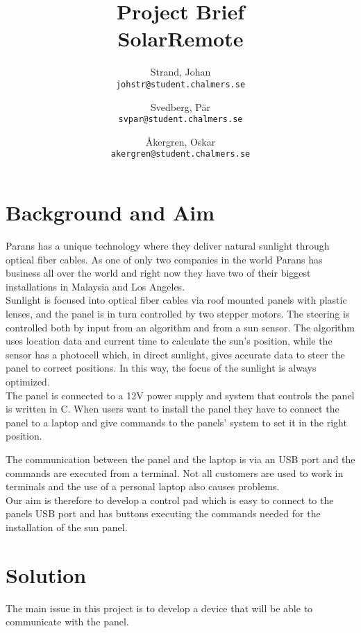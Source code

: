 \documentclass[a4paper]{article}
\author{    Strand, Johan \\ \texttt{johstr@student.chalmers.se} \and
            Svedberg, Pär\\ \texttt{svpar@student.chalmers.se} \and
            Åkergren, Oskar\\ \texttt{akergren@student.chalmers.se}
}
\title{\vspace{-3cm} Project Brief  \\ SolarRemote}
\begin{document}
	\maketitle

	\section*{Background and Aim} %
	\label{sec:background_and_aim}
    	Parans has a unique technology where they deliver natural sunlight through optical fiber cables. As one of only two companies in the world Parans has business all over the world and right now they have two of their biggest installations in Malaysia and Los Angeles. \\

    	\noindent Sunlight is focused into optical fiber cables via roof mounted panels with plastic lenses, and the panel is in turn controlled by two stepper motors. The steering is controlled both by input from an algorithm and from a sun sensor. The algorithm uses location data and current time to calculate the sun's position, while the sensor has a photocell which, in direct sunlight, gives accurate data to steer the panel to correct positions. In this way, the focus of the sunlight is always optimized. \\

        \noindent The panel is connected to a 12V power supply and system that controls the panel is written in C. When users want to install the panel they have to connect the panel to a laptop and give commands to the panels' system to set it in the right position.
        
        The communication between the panel and the laptop is via an USB port and the commands are executed from a terminal. Not all customers are used to work in terminals and the use of a personal laptop also causes problems. \\

        \noindent Our aim is therefore to develop a control pad which is easy to connect to the panels USB port and has buttons executing the commands needed for the installation of the sun panel.
        

    \section*{Solution} %
    \label{sec:solution}
        The main issue in this project is to develop a device that will be able to communicate with the panel. \\
\end{document}

